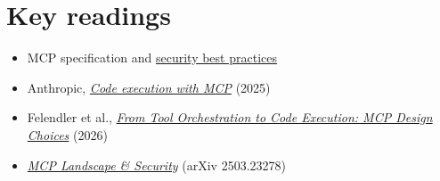 \documentclass[10pt,oneside]{report}
\begin{document}
\section{Key readings}
\begin{itemize}
\item MCP specification and \href{https://modelcontextprotocol.io/docs/2026-07-28/tutorials/security/security_best_practices}{security best practices}
\item Anthropic, \href{https://www.anthropic.com/engineering/code-execution-with-mcp}{\emph{Code execution with MCP}} (2025)
\item Felendler et al., \href{https://arxiv.org/abs/2602.15945}{\emph{From Tool Orchestration to Code Execution: MCP Design Choices}} (2026)
\item \href{https://arxiv.org/abs/2503.23278}{\emph{MCP Landscape \& Security}} (arXiv 2503.23278)
\end{itemize}
\end{document}
